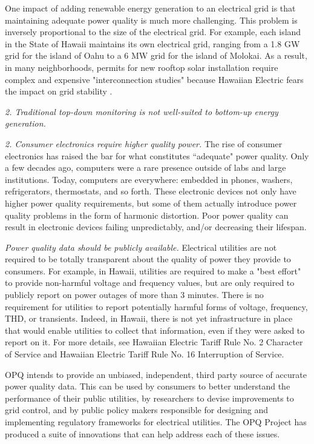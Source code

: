 One impact of adding renewable energy generation to an electrical grid is that maintaining adequate power quality is much more challenging. This problem is inversely proportional to the size of the electrical grid. For example, each island in the State of Hawaii maintains its own electrical grid, ranging from a 1.8 GW grid for the island of Oahu to a 6 MW grid for the island of Molokai.  As a result, in many neighborhoods, permits for new rooftop solar installation require complex and expensive "interconnection studies" because Hawaiian Electric fears the impact on grid stability \cite{trabish_solar_2014,anastasi_energy_2009}.

{\em 2. Traditional top-down monitoring is not well-suited to bottom-up energy generation.}

\cite{nakafuji_back--basics_2011}

{\em 2. Consumer electronics require higher quality power.} The rise of consumer electronics has raised the bar for what constitutes ``adequate" power quality. Only a few decades ago, computers were a rare presence outside of labs and large institutions. Today, computers are everywhere: embedded in phones, washers, refrigerators, thermostats, and so forth. These electronic devices not only have higher power quality requirements, but some of them actually introduce power quality problems in the form of harmonic distortion. Poor power quality can result in electronic devices failing unpredictably, and/or decreasing their lifespan.

{\em Power quality data should be publicly available.} Electrical utilities are not required to be totally transparent about the quality of power they provide to consumers. For example, in Hawaii, utilities are required to make a "best effort" to provide non-harmful voltage and frequency values, but are only required to publicly report on power outages of more than 3 minutes. There is no requirement for utilities to report potentially harmful forms of voltage, frequency, THD, or transients. Indeed, in Hawaii, there is not yet infrastructure in place that would enable utilities to collect that information, even if they were asked to report on it. For more details, see Hawaiian Electric Tariff Rule No. 2 Character of Service and Hawaiian Electric Tariff Rule No. 16 Interruption of Service.

OPQ intends to provide an unbiased, independent, third party source of accurate power quality data. This can be used by consumers to better understand the performance of their public utilities, by researchers to devise improvements to grid control, and by public policy makers responsible for designing and implementing regulatory frameworks for electrical utilities.  The OPQ Project has produced a suite of innovations that can help address each of these issues.

